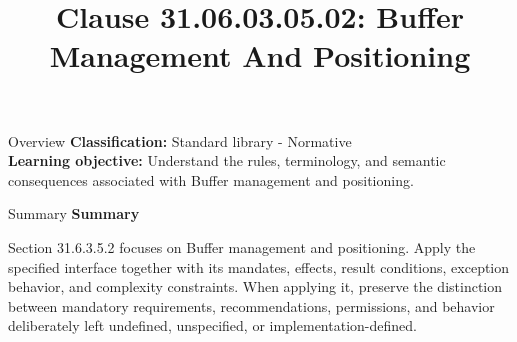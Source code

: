 \documentclass[10pt,letterpaper]{article}
\title{Clause 31.06.03.05.02: Buffer Management And Positioning}
\author{}
\date{}
\begin{document}
\maketitle
\begin{CornellOverviewBox}{Overview}
\textbf{Classification:} Standard library - Normative\\[2pt]
\textbf{Learning objective:} Understand the rules, terminology, and semantic consequences associated with Buffer management and positioning.
\end{CornellOverviewBox}\begin{CornellSummaryBox}{Summary}
{\sffamily\bfseries\color{Accent} Summary}\par\vspace{3pt}Section 31.6.3.5.2 focuses on Buffer management and positioning. Apply the specified interface together with its mandates, effects, result conditions, exception behavior, and complexity constraints. When applying it, preserve the distinction between mandatory requirements, recommendations, permissions, and behavior deliberately left undefined, unspecified, or implementation-defined.
\end{CornellSummaryBox}
\end{document}
